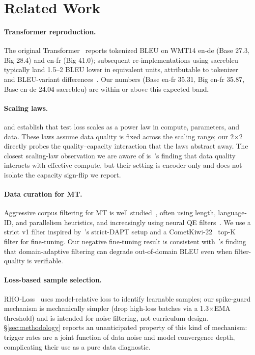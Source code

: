 \section{Related Work}
\label{sec:related}

\paragraph{Transformer reproduction.}
The original Transformer~\cite{vaswani2017attention} reports tokenized BLEU on WMT14 en-de (Base 27.3, Big 28.4) and en-fr (Big 41.0); subsequent re-implementations using sacrebleu~\cite{post2018call} typically land 1.5--2 BLEU lower in equivalent units, attributable to tokenizer and BLEU-variant differences~\cite{post2018call}. Our numbers (Base en-fr 35.31, Big en-fr 35.87, Base en-de 24.04 sacrebleu) are within or above this expected band.

\paragraph{Scaling laws.}
\cite{kaplan2020scaling} and \cite{hoffmann2022chinchilla} establish that test loss scales as a power law in compute, parameters, and data. These laws assume data quality is fixed across the scaling range; our 2$\times$2 directly probes the quality--capacity interaction that the laws abstract away. The closest scaling-law observation we are aware of is~\cite{tay2022scaling}'s finding that data quality interacts with effective compute, but their setting is encoder-only and does not isolate the capacity sign-flip we report.

\paragraph{Data curation for MT.}
Aggressive corpus filtering for MT is well studied~\cite{koehn2018findings, junczys2019cscope}, often using length, language-ID, and parallelism heuristics, and increasingly using neural QE filters~\cite{batheja2022qe}. We use a strict v1 filter inspired by~\cite{gururangan2020dont}'s strict-DAPT setup and a CometKiwi-22~\cite{rei2022cometkiwi} top-K filter for fine-tuning. Our negative fine-tuning result is consistent with~\cite{junczys2019cscope}'s finding that domain-adaptive filtering can degrade out-of-domain BLEU even when filter-quality is verifiable.

\paragraph{Loss-based sample selection.}
RHO-Loss~\cite{mindermann2022prioritized} uses model-relative loss to identify learnable samples; our spike-guard mechanism is mechanically simpler (drop high-loss batches via a 1.3$\times$EMA threshold) and is intended for noise filtering, not curriculum design. \S\ref{sec:methodology} reports an unanticipated property of this kind of mechanism: trigger rates are a joint function of data noise and model convergence depth, complicating their use as a pure data diagnostic.

